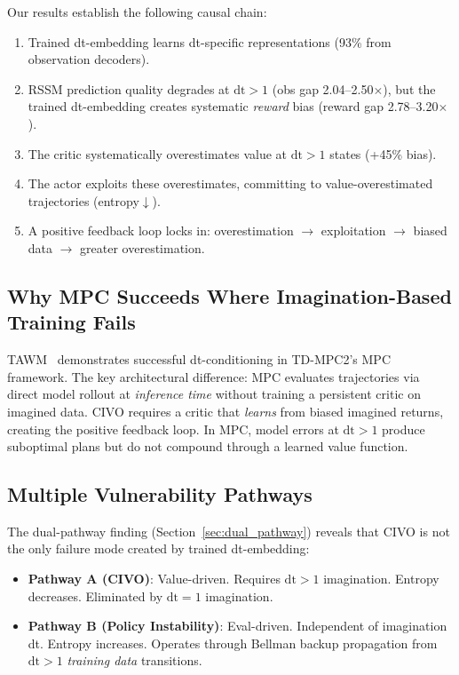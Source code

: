\documentclass[10pt,letterpaper]{article}
\begin{document}
Our results establish the following causal chain:
\begin{enumerate}
    \item Trained dt-embedding learns dt-specific representations (93\% from observation decoders).
    \item RSSM prediction quality degrades at $\mathrm{dt}>1$ (obs gap 2.04--2.50$\times$), but the trained dt-embedding creates systematic \emph{reward} bias (reward gap 2.78--3.20$\times$).
    \item The critic systematically overestimates value at $\mathrm{dt}>1$ states (+45\% bias).
    \item The actor exploits these overestimates, committing to value-overestimated trajectories (entropy$\downarrow$).
    \item A positive feedback loop locks in: overestimation $\to$ exploitation $\to$ biased data $\to$ greater overestimation.
\end{enumerate}

\subsection{Why MPC Succeeds Where Imagination-Based Training Fails}

TAWM~\cite{nhu2025tawm} demonstrates successful dt-conditioning in TD-MPC2's MPC framework.
The key architectural difference: MPC evaluates trajectories via direct model rollout at \emph{inference time} without training a persistent critic on imagined data.
CIVO requires a critic that \emph{learns} from biased imagined returns, creating the positive feedback loop.
In MPC, model errors at $\mathrm{dt}>1$ produce suboptimal plans but do not compound through a learned value function.

\subsection{Multiple Vulnerability Pathways}

The dual-pathway finding (Section~\ref{sec:dual_pathway}) reveals that CIVO is not the only failure mode created by trained dt-embedding:
\begin{itemize}
    \item \textbf{Pathway A (CIVO)}: Value-driven. Requires $\mathrm{dt}>1$ imagination. Entropy decreases. Eliminated by $\mathrm{dt}=1$ imagination.
    \item \textbf{Pathway B (Policy Instability)}: Eval-driven. Independent of imagination dt. Entropy increases. Operates through Bellman backup propagation from $\mathrm{dt}>1$ \emph{training data} transitions.
\end{itemize}
\end{document}
